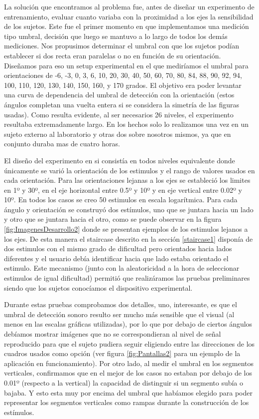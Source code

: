 \documentclass{article}
\begin{document}
    La solución que encontramos al problema fue, antes de diseñar un experimento de entrenamiento, evaluar cuanto variaba con la proximidad a los ejes la sensibilidad de los sujetos. Este fue el primer momento en que implementamos una medición tipo umbral, decisión que luego se mantuvo a lo largo de todos los demás mediciones. Nos propusimos determinar el umbral con que los sujetos podían establecer si dos recta eran paralelas o no en función de su orientación. Diseñamos para eso un setup experimental en el que mediríamos el umbral para orientaciones de -6, -3, 0, 3, 6, 10, 20, 30, 40, 50, 60, 70, 80, 84, 88, 90, 92, 94, 100, 110, 120, 130, 140, 150, 160, y 170 grados. El objetivo era poder levantar una curva de dependencia del umbral de detección con la orientación (estos ángulos completan una vuelta entera si se considera la simetría de las figuras usadas). Como resulta evidente, al ser necesarios 26 niveles, el experimento resultaba extremadamente largo. En los hechos solo lo realizamos una vez en un sujeto externo al laboratorio y otras dos sobre nosotros mismos, ya que en conjunto duraba mas de cuatro horas.  
    
    El diseño del experimento en si consistía en todos niveles equivalente donde únicamente se varió la orientación de los estimulos y el rango de valores usados en cada orientación. Para las orientaciones lejanas a los ejes se estableció los limites en 1º y 30º, en el eje horizontal entre 0.5º y 10º y en eje vertical entre 0.02º y 10º. En todos los casos se creo 50 estimulos en escala logarítmica. Para cada ángulo y orientación se construyó dos estímulos, uno que se juntara hacia un lado y otro que se juntara hacia el otro, como se puede observar en la figura \ref{fig:ImagenesDesarrollo2} donde se presentan ejemplos de los estimulos lejanos a los ejes. De esta manera el staircase descrito en la sección \ref{staircase1} disponía de dos estimulos con el mismo grado de dificultad pero orientados hacia lados diferentes y el usuario debía identificar hacia que lado estaba orientado el estimulo. Este mecanismo (junto con la aleatoricidad a la hora de seleccionar estimulos de igual dificultad) permitió que realizáramos las pruebas preliminares siendo que los sujetos conocíamos el dispositivo experimental.
    
    Durante estas pruebas comprobamos dos detalles, uno, interesante, es que el umbral de detección sonoro resulto ser mucho más sensible que el visual (al menos en las escalas gráficas utilizadas), por lo que por debajo de ciertos ángulos debíamos mostrar imágenes que no se correspondieran al nivel de señal reproducido para que el sujeto pudiera seguir eligiendo entre las direcciones de los cuadros usados como opción (ver figura \ref{fig:Pantallas2} para un ejemplo de la aplicación en funcionamiento). Por otro lado, al medir el umbral en los segmentos verticales, confirmamos que en el mejor de los casos no estaban por debajo de los 0.01º (respecto a la vertical) la capacidad de distinguir si un segmento subía o bajaba. Y esto esta muy por encima del umbral que habíamos elegido para poder representar los segmentos verticales como rampas durante la construcción de los estímulos. 
    
\end{document}
